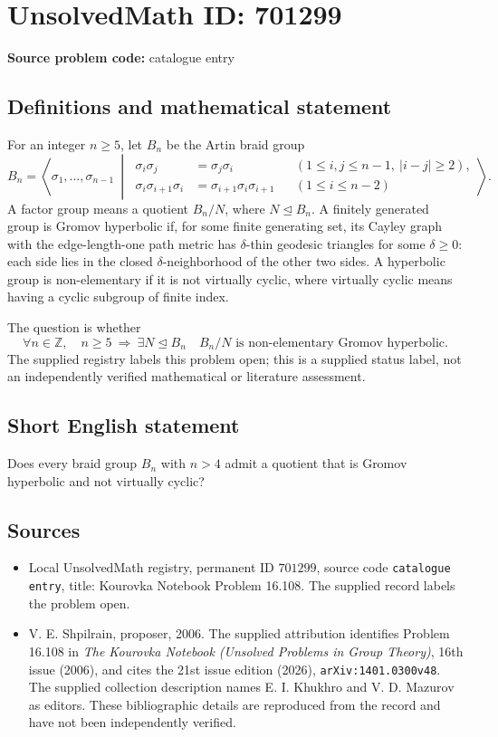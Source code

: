 \documentclass[11pt]{article}
\newcommand{\Z}{\mathbb{Z}}
\begin{document}
\section*{UnsolvedMath ID: 701299}
\textbf{Source problem code:} catalogue entry
\subsection{Definitions and mathematical statement}
For an integer \(n\geq 5\), let \(B_n\) be the Artin braid group
\[
B_n=\left\langle \sigma_1,\ldots,\sigma_{n-1}\ \middle|\ 
\begin{aligned}
\sigma_i\sigma_j&=\sigma_j\sigma_i &&(1\leq i,j\leq n-1,\ |i-j|\geq 2),\\
\sigma_i\sigma_{i+1}\sigma_i&=\sigma_{i+1}\sigma_i\sigma_{i+1} &&(1\leq i\leq n-2)
\end{aligned}
\right\rangle.
\]
A factor group means a quotient \(B_n/N\), where \(N\trianglelefteq B_n\). A finitely generated group is Gromov hyperbolic if, for some finite generating set, its Cayley graph with the edge-length-one path metric has \(\delta\)-thin geodesic triangles for some \(\delta\geq 0\): each side lies in the closed \(\delta\)-neighborhood of the other two sides. A hyperbolic group is non-elementary if it is not virtually cyclic, where virtually cyclic means having a cyclic subgroup of finite index.

The question is whether
\[
\forall n\in\Z,\quad n\geq 5\ \Longrightarrow\ 
\exists N\trianglelefteq B_n\quad
B_n/N\text{ is non-elementary Gromov hyperbolic}.
\]
The supplied registry labels this problem open; this is a supplied status label, not an independently verified mathematical or literature assessment.
\subsection{Short English statement}
Does every braid group \(B_n\) with \(n>4\) admit a quotient that is Gromov hyperbolic and not virtually cyclic?
\subsection{Sources}
\begin{itemize}
\item Local UnsolvedMath registry, permanent ID \(701299\), source code \texttt{catalogue entry}, title: Kourovka Notebook Problem 16.108. The supplied record labels the problem open.
\item V. E. Shpilrain, proposer, 2006. The supplied attribution identifies Problem 16.108 in \emph{The Kourovka Notebook (Unsolved Problems in Group Theory)}, 16th issue (2006), and cites the 21st issue edition (2026), \texttt{arXiv:1401.0300v48}. The supplied collection description names E. I. Khukhro and V. D. Mazurov as editors. These bibliographic details are reproduced from the record and have not been independently verified.
\end{itemize}
\end{document}
